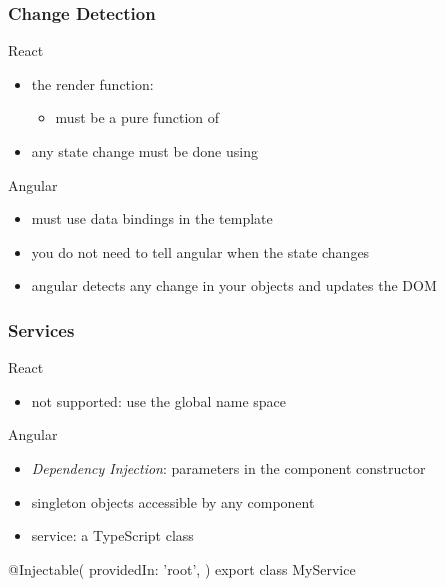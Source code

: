 \begin{frame}[fragile] \frametitle{Change Detection}
React
\begin{itemize}
  \item the render function:
  \begin{itemize}
    \item must be a pure function of 
  \end{itemize}
  \item any state change must be done using 
\end{itemize}
\vspace{5mm}
Angular
\begin{itemize}
  \item must use data bindings in the template
  \item you do not need to tell angular when the state changes
  \item angular detects any change in your objects and updates the DOM
\end{itemize}
\end{frame}

\begin{frame}[fragile] \frametitle{Services}
React
\begin{itemize}
  \item not supported: use the global name space
\end{itemize}
\vspace{5mm}
Angular
\begin{itemize}
  \item \emph{Dependency Injection}: parameters in the component constructor
  \item singleton objects accessible by any component
  \item service: a TypeScript class
\end{itemize}
\begin{CodeBox}{}
@Injectable({
  providedIn: 'root',
})
export class MyService {
}
\end{CodeBox}
\end{frame}

